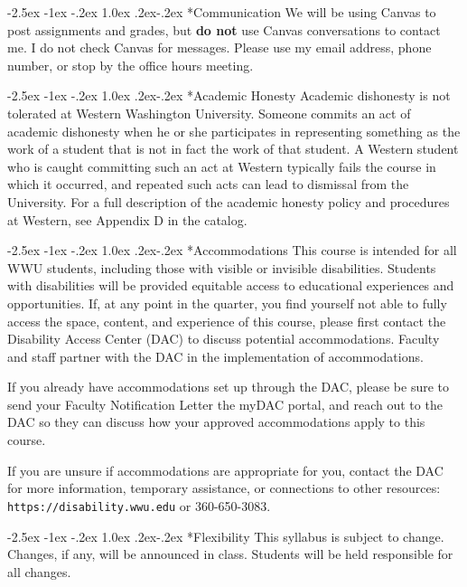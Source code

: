 \documentclass[letterpaper,12pt]{article}
\makeatletter
\renewcommand\section{%
  \@startsection {section}{1}{\z@}%
  {-2.5ex \@plus -1ex \@minus -.2ex}%
  {1.0ex \@plus.2ex\@minus-.2ex}%
  {\normalfont\Large\bfseries}}
\makeatother
\begin{document}
\section*{Communication}
We will be using Canvas to post assignments and grades, but \textbf{do not} use
Canvas conversations to contact me.  I do not check Canvas for messages.  Please
use my email address, phone number, or stop by the office hours meeting.

\section*{Academic Honesty}
Academic dishonesty is not tolerated at Western Washington University. Someone
commits an act of academic dishonesty when he or she participates in
representing something as the work of a student that is not in fact the work of
that student. A Western student who is caught committing such an act at Western
typically fails the course in which it occurred, and repeated such acts can lead
to dismissal from the University. For a full description of the academic honesty
policy and procedures at Western, see Appendix D in the catalog.

\section*{Accommodations}
This course is intended for all WWU students, including those with visible or
invisible disabilities. Students with disabilities will be provided equitable
access to educational experiences and opportunities. If, at any point in the
quarter, you find yourself not able to fully access the space, content, and
experience of this course, please first contact the Disability Access Center
(DAC) to discuss potential accommodations. Faculty and staff partner with the
DAC in the implementation of accommodations.

If you already have accommodations set up through the DAC, please be sure to
send your Faculty Notification Letter the myDAC portal, and reach out to the DAC
so they can discuss how your approved accommodations apply to this course.

If you are unsure if accommodations are appropriate for you, contact the DAC for
more information, temporary assistance, or connections to other resources:
\texttt{https://disability.wwu.edu} or 360-650-3083.

\section*{Flexibility}
This syllabus is subject to change.  Changes, if any, will be announced in
class.  Students will be held responsible for all changes.
\end{document}
